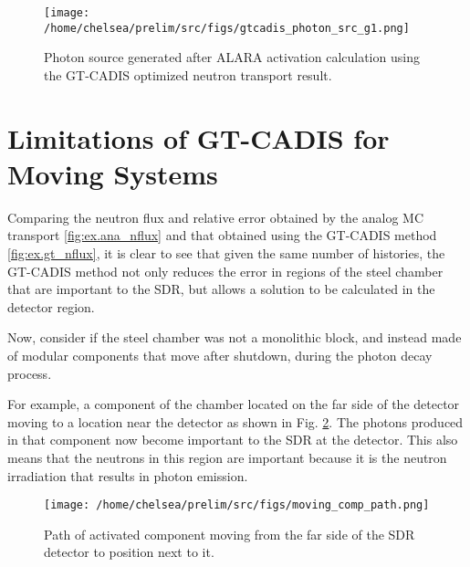 \begin{figure} 
	\texttt{[image: /home/chelsea/prelim/src/figs/gtcadis\_photon\_src\_g1.png]}
	\caption [GT-CADIS photon source]
	{Photon source generated after ALARA activation calculation using the
	GT-CADIS optimized neutron transport result.\label{fig:ex.gt_psrc}}
\end{figure}




\section{Limitations of GT-CADIS for Moving Systems}

Comparing the neutron flux and relative error obtained by the analog MC 
transport \ref{fig:ex.ana_nflux}  and that obtained using the GT-CADIS method
\ref{fig:ex.gt_nflux}, it is clear to see that given the same number of
histories, the GT-CADIS method not only reduces the error in regions of the
steel chamber that are important to the SDR, but allows a solution to be
calculated in the detector region.


Now, consider if the steel
chamber was not a monolithic block, and instead
made of modular components that move after shutdown, during the
photon decay process.

For example,
a component of the chamber located on the far side of the detector moving to a
location near the detector as shown in Fig. \ref{fig:path}.
The photons produced in that component now become
important to the SDR at the detector.  This also means that the neutrons in
this region are important because it is the neutron irradiation that results
in photon emission.

\begin{figure} 
	\texttt{[image: /home/chelsea/prelim/src/figs/moving\_comp\_path.png]}
	\caption[Path of moving component]
	{Path of activated component moving from the far side of the SDR
	detector to position next to it.\label{fig:path}}
\end{figure}

